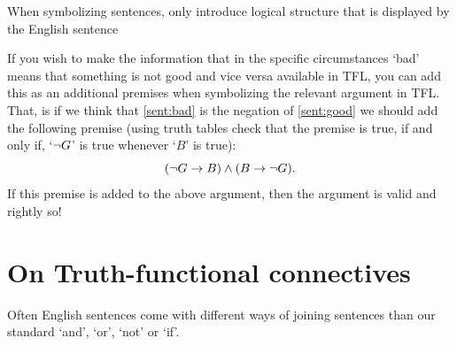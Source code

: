 \begin{highlighted}When symbolizing sentences, only introduce logical structure that is displayed by the English sentence\end{highlighted}

If you wish to make the information that in the specific circumstances `bad' means that something is not good and vice versa available in TFL, you can add this as an additional premises when symbolizing the relevant argument in TFL. That, is if we think that \cref{sent:bad} is the negation of \cref{sent:good} we should add the following premise (using truth tables check that the premise is true, if and only if, `$\neg G$' is true whenever `$B$' is true): $$(\neg G\rightarrow B)\mathbin{\wedge} (B\rightarrow \neg G).$$ If this premise is added to the above argument, then the argument is valid and rightly so!





\chapter{On Truth-functional connectives}
\label{sec:TruthFunctionality}


Often English sentences come with different ways of joining sentences than our standard `and', `or', `not' or `if'. 

